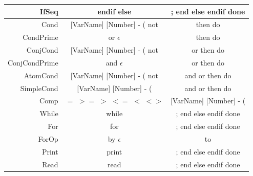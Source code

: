\documentclass[letterpaper]{article}
\begin{document}
\begin{center}
\begin{tabular}{| r || c | c |}
        IfSeq & endif else & ; end else endif done \\
        \hline
        Cond & [VarName] [Number] - ( not & then do \\
        \hline
        CondPrime & or $\epsilon$ & then do \\
        \hline
        ConjCond & [VarName] [Number] - ( not &
        or then do  \\
        \hline
        ConjCondPrime & and $\epsilon$ & or then do\\
        \hline
        AtomCond & [VarName] [Number] - ( not &
        and or then do \\
        \hline
        SimpleCond & [VarName] [Number] - ( &
        and or then do \\
        \hline
        Comp & $=$ $>=$ $>$ $<=$ $<$ $<>$ &
        [VarName] [Number] - ( \\
        \hline
        While & while & ; end else endif done \\
        \hline
        For & for & ; end else endif done \\
        \hline
        ForOp & by $\epsilon$ & to \\
        \hline
        Print & print & ; end else endif done \\
        \hline
        Read & read & ; end else endif done \\
        \hline
    \end{tabular}
\end{center}
\end{document}

